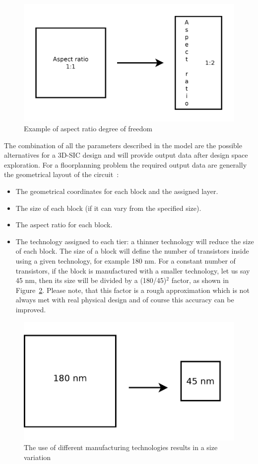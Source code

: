 \begin{figure}[h!]
\begin{center}
\includegraphics[width=0.6\linewidth]{form_factor_ex.pdf}
\end{center}
\vspace{-0.5cm}
\caption{Example of aspect ratio degree of freedom}
\label{fig:ff_ex}
\end{figure}

The combination of all the parameters described in the model are the possible alternatives for a 3D-SIC design and will provide output data after design space exploration. For a floorplanning problem the required output data are generally the geometrical layout of the circuit~\cite{DBLP:conf/3dic/MilojevicCCRRSAPM09}:
\begin{itemize}
\item The geometrical coordinates for each block and the assigned layer.
\item The size of each block (if it can vary from the specified size).
\item The aspect ratio for each block.
\item The technology assigned to each tier: a thinner technology will reduce the size of each block. The size of a block will define the number of transistors inside using a given technology, for example 180 nm. For a constant number of transistors, if the block is manufactured with a smaller technology, let us say 45 nm, then its size will be divided by a (180/45)$^2$ factor, as shown in Figure~\ref{fig:tech_ex}. Please note, that this factor is a rough approximation which is not always met with real physical design and of course this accuracy can be improved.
\end{itemize}

\begin{figure}[h!]
\begin{center}
\includegraphics[width=0.5\linewidth]{tech_ex.pdf}
\end{center}
\vspace{-0.5cm}
\caption{The use of different manufacturing technologies results in a size variation}
\label{fig:tech_ex}
\end{figure}

